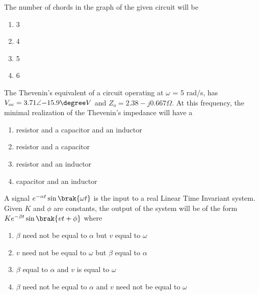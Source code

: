 \item The number of chords in the graph of the given circuit will be
\begin{figure}[!ht]
\centering
\resizebox{0.5\textwidth}{!}{%

}%
\end{figure}
    \begin{enumerate}
        \item 3
        \item 4
        \item 5
        \item 6 \\
    \end{enumerate}
\item The Thevenin's equivalent of a circuit operating at $\omega$ = 5 rad/s, has $V_{oc} = 3.71\angle{-15.9\degree} V$ and $Z_o = 2.38 - j0.667\Omega$. At this frequency, the minimal realization of the Thevenin's impedance will have a
\begin{enumerate}
    \item resistor and a capacitor and an inductor
    \item resistor and a capacitor
    \item resistor and an inductor
    \item capacitor and an inductor \\
\end{enumerate}
\item A signal $e^{-\alpha t}\sin\brak{\omega t}$ is the input to a real Linear Time Invariant system. Given $K$ and $\phi$ are constants, the output of the system will be of the form $Ke^{-\beta t}\sin\brak{vt+\phi}$ where
\begin{enumerate}
    \item $\beta$ need not be equal to $\alpha$ but $v$ equal to $\omega$
    \item $v$ need not be equal to $\omega$ but $\beta$ equal to $\alpha$
    \item $\beta$ equal to $\alpha$ and $v$ is equal to $\omega$
    \item $\beta$ need not be equal to $\alpha$ and $v$ need not be equal to $\omega$ \\
\end{enumerate}
